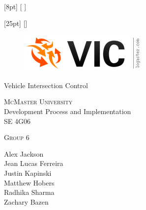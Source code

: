 \documentclass [12pt]{article}
\begin{document}

[8pt]                                               %
{}%
{\contentsmargin{2pt}                               %
\thecontentslabel {\enspace }  %
}
{\contentsmargin{0pt}\Large}                        %
{\contentspage} %
[ ] %

[25pt]                                               %
{}%
{\contentsmargin{0pt}                               %
\thecontentslabel\enspace\enspace%
}
{\contentsmargin{4pt}\large}                        %
{\contentspage} %
[] %




\begin {center} 

\thispagestyle{empty}
\vspace*{4.5cm}



\begin {figure}[h!]
\centering
\includegraphics [scale = .5, trim={.4cm 0 .8cm 0},clip] {figures/vic_logo.png}
\end {figure}

{\fontfamily{\cabinfamily}\selectfont
\Huge{Vehicle Intersection Control} }

\vspace{1 cm}
{\LARGE{\textsc{McMaster University}}\\}  \vspace {1cm}
{\Large Development Process and Implementation\\ \vspace {0.5 cm} SE 4G06}  \vspace {1cm}

{\large \textsc{Group 6} \\} \vspace{1cm}

{
Alex Jackson \\
Jean Lucas Ferreira \\
Justin Kapinski\\
Matthew Hobers\\
Radhika Sharma\\
Zachary Bazen}




\end{center}
\end{document}
